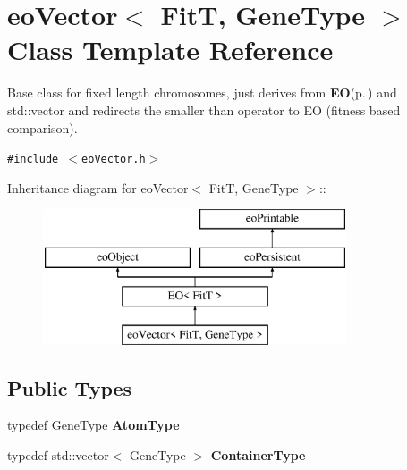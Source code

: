 \section{eo\-Vector$<$ Fit\-T, Gene\-Type $>$ Class Template Reference}
\label{classeo_vector}
Base class for fixed length chromosomes, just derives from {\bf EO}{\rm (p.\,\pageref{class_e_o})} and std::vector and redirects the smaller than operator to EO (fitness based comparison).  


{\tt \#include $<$eo\-Vector.h$>$}

Inheritance diagram for eo\-Vector$<$ Fit\-T, Gene\-Type $>$::\begin{figure}[H]
\begin{center}
\leavevmode
\includegraphics[height=4cm]{classeo_vector}
\end{center}
\end{figure}
\subsection*{Public Types}
\begin{CompactItemize}
\item 
typedef Gene\-Type {\bf Atom\-Type}\label{classeo_vector_w0}

\item 
typedef std::vector$<$ Gene\-Type $>$ {\bf Container\-Type}\label{classeo_vector_w1}

\end{CompactItemize}

